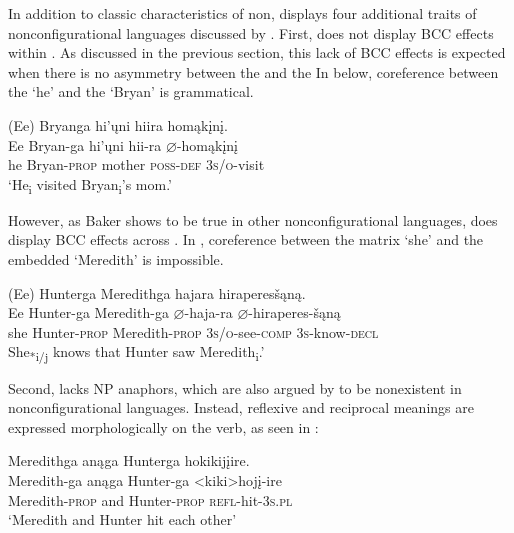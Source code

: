 \documentclass[output=paper]{LSP/langsci}
\begin{document}
In addition to  classic characteristics of non,  displays four additional traits of nonconfigurational languages discussed by \citet{Baker1996}. First,  does not display BCC effects within .  As discussed in the previous section, this lack of BCC effects is expected when there is no asymmetry between the  and the  In  below, coreference between the  `he' and the  `Bryan' is grammatical.

\begin{exe}
\ex\label{ex:jrs:16}	
\glll (Ee) 	Bryanga 			hi'\k{u}ni 	hiira 				homąk\k{i}n\k{i}. \\
Ee 		Bryan-ga 		hi'\k{u}ni 	hii-ra 			$\varnothing$-homąk\k{i}n\k{i} \\
he 		Bryan-\textsc{prop} mother 	\textsc{poss-def} 	\textsc{3s/o}-visit  \\
\trans `He\textsubscript{i} visited Bryan\textsubscript{i}'s mom.'
\end{exe}
However, as Baker shows to be true in other nonconfigurational languages,  does display BCC effects across . In , coreference between the matrix  `she' and the embedded  `Meredith' is impossible.

\begin{exe}
\ex\label{ex:jrs:17}	
\glll (Ee) 	Hunterga 	Meredithga		hajara 						hiraperes\v{s}ąną. \\
 Ee 		Hunter-ga 	Meredith-ga 		$\varnothing$-haja-ra 				$\varnothing$-hiraperes-\v{s}ąną \\
she 		Hunter-\textsc{prop} 	Meredith-\textsc{prop} 	\textsc{3s/o}-see-\textsc{comp} 	\textsc{3s}-know-\textsc{decl}  \\
\trans She\textsubscript{*i/j} knows that Hunter saw Meredith\textsubscript{i}.'
\end{exe}	

Second,  lacks NP anaphors, which are also argued by \citet{Baker1996} to be nonexistent in nonconfigurational languages. Instead, reflexive and reciprocal meanings are expressed morphologically on the verb, as seen in :

\begin{exe}
\ex\label{ex:jrs:18} 
\glll Meredithga		anąga 	Hunterga 			hokikij\k{i}ire.\\
Meredith-ga	 	anąga 	Hunter-ga 			<kiki>hoj\k{i}-ire \\
Meredith-\textsc{prop} and 		Hunter-\textsc{prop} 	\textsc{refl}-hit-\textsc{3s.pl} \\
\trans `Meredith and Hunter hit each other'
\end{exe}
	
\end{document}

